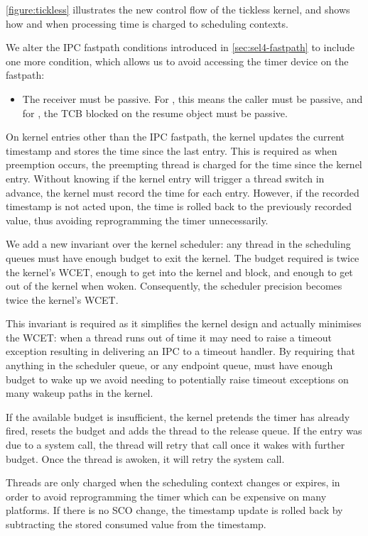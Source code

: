 \cref{figure:tickless} illustrates the new control flow of the tickless kernel, and shows
how and when processing time is charged to scheduling contexts.

We alter the IPC fastpath conditions introduced in \cref{sec:sel4-fastpath} to include one
more condition, which allows us to avoid accessing the timer device on the fastpath:
\begin{itemize}
    \item The receiver must be passive. For \call, this means the caller must be passive, and
          for \replyrecv, the TCB blocked on the resume object must be passive.
\end{itemize}

\label{p:impl-fastpath}
On kernel entries other than the IPC fastpath, the kernel updates the current
timestamp and stores the time since the last entry. This is required as when preemption occurs, the
preempting thread is charged for the time since the kernel entry. Without knowing if the kernel entry will
trigger a thread switch in advance, the kernel must record the time for each entry. However, if the
recorded timestamp is not acted upon, the time is rolled back to the previously recorded value,
thus avoiding reprogramming the timer unnecessarily.

We add a new invariant over the kernel scheduler: any thread in the 
scheduling queues must have enough budget to exit the kernel. The budget required is twice the
kernel's WCET, enough to get into the kernel and block, and enough to get out of the kernel 
when woken. 
Consequently, the scheduler precision becomes twice the kernel's WCET.

This invariant is required as it simplifies the kernel design and actually minimises the WCET: when
a
thread runs out of time it may need to raise a timeout exception resulting in delivering an IPC to a
timeout handler. By requiring that anything in the scheduler queue, or any endpoint queue, must have
enough budget to wake up we avoid needing to potentially raise timeout exceptions on many wakeup
paths in the kernel.

If the available budget is insufficient, the kernel pretends the timer has already fired,
resets the budget and adds the thread to the release queue. If the entry was due to a system call,
the thread will retry that call once it wakes with further budget.
Once the thread is awoken, it will retry the system call.

Threads are only charged when the scheduling context changes or expires, in order to avoid
reprogramming the timer which can be expensive on many platforms. 
If there is no \gls{SCO} change, the timestamp update is rolled back by subtracting the
stored consumed value from the timestamp.

